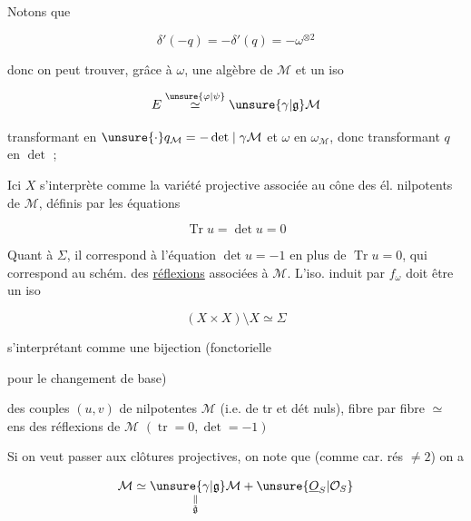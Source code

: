 
Notons que

\[
\delta'(-q)=-\delta'(q)=-\omega^{\otimes2}
\]

donc  on peut trouver, grâce à $\omega$, une algèbre de  $\mathcal M$ et un iso

\[
E\overset{\unsure{\varphi|\psi}}{\simeq}\unsure{\gamma|\mathfrak g}\mathcal M
\]

transformant  en $\unsure{\cdot}q_{\mathcal M}=-\det\mid\gamma\mathcal M$ et $\omega$ en $\omega_{\mathcal M}$, donc transformant $q$ en $\det$ ; 



Ici $X$ s'interprète comme la variété projective associée au cône des él.  nilpotents de $\mathcal M$, définis par les équations

\[
\operatorname{Tr}u=\det u=0
\]

Quant à $\Sigma$, il correspond à l'équation $\det u=-1$ en plus de $\operatorname{Tr}u=0$, qui correspond au schém. des \uline{réflexions} associées à $\mathcal M$. L'iso. induit par $f_\omega$ doit être un iso

\[
(X\times X)\setminus X\simeq\Sigma
\]

s'interprétant comme une bijection (fonctorielle


pour le changement de base)

 des couples $(u,v)$ de    nilpotentes $\mathcal M$  (i.e. de tr et dét nuls),  fibre par fibre $\simeq$ ens des réflexions de $\mathcal M$ $(\operatorname{tr}=0,\det=-1)$


Si on veut passer aux clôtures projectives, on note que (comme car. rés $\ne2$) on a

\[
\mathcal M\simeq\underset{\substack{\Vert\\\tilde{\mathfrak g}}}{\unsure{\gamma|\mathfrak g}\mathcal M}+\unsure{\underline O_S|\mathcal O_S}
\]

